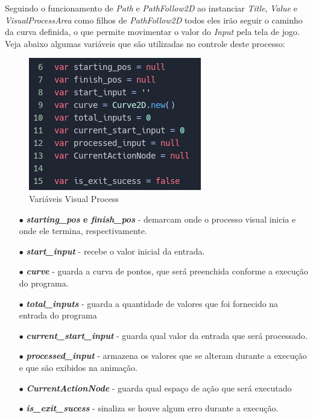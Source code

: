 Seguindo o funcionamento de \textit{Path} e \textit{PathFollow2D} ao instanciar
\textit{Title}, \textit{Value} e \textit{VisualProcessArea} como filhos de
\textit{PathFollow2D} todos eles irão seguir o caminho da curva definida, o que
permite movimentar o valor do \textit{Input} pela tela de jogo. Veja abaixo
algumas variáveis que são utilizadas no controle deste processo:

\begin{figure}[H]
    \includegraphics[scale=0.8]{../figuras/variaveis_visual_process.png}
    \caption{Variáveis Visual Process}
\end{figure}

\begin{itemize}
    \item[$\bullet$]
        \textbf{\textit{starting\_pos} e \textit{finish\_pos}} - demarcam onde o 
        processo visual inicia e onde ele termina, respectivamente.
    \item[$\bullet$]
        \textbf{\textit{start\_input}} - recebe o valor inicial da entrada.
    \item[$\bullet$]
        \textbf{\textit{curve}} - guarda a curva 
        de pontos, que será preenchida conforme a execução do programa.
    \item[$\bullet$] 
        \textbf{\textit{total\_inputs}} - guarda a quantidade de valores que foi 
        fornecido na entrada do programa
    \item[$\bullet$]
        \textbf{\textit{current\_start\_input}} - guarda qual valor da entrada que será
        processado.
    \item[$\bullet$]
        \textbf{\textit{processed\_input}} - armazena os 
        valores que se alteram durante a execução e que são exibidos na 
        animação.
    \item[$\bullet$] 
        \textbf{\textit{CurrentActionNode}} - guarda qual espaço de ação que será
        executado
    \item[$\bullet$] 
        \textbf{\textit{is\_exit\_sucess}} - sinaliza se houve algum erro 
        durante a execução.
\end{itemize}

